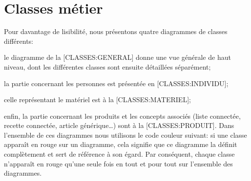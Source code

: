 \chapter[CH:CM]{Classes métier}

Pour davantage de lisibilité, nous présentons quatre diagrammes de classes différents:
\startitemize
\item le diagramme de la [CLASSES:GENERAL] donne une vue générale de haut niveau, dont les différentes classes sont ensuite détaillées séparément;
\item la partie concernant les personnes est présentée en [CLASSES:INDIVIDU];
\item celle représentant le matériel est à la [CLASSES:MATERIEL];
\item enfin, la partie concernant les produits et les concepts associés (liste connectée, recette connectée, article générique\dots) sont à la [CLASSES:PRODUIT].
\stopitemize
Dans l'ensemble de ces diagrammes nous utilisons le code couleur suivant: si une classe apparaît en rouge sur un diagramme, cela signifie que ce diagramme la définit complètement et sert de référence à son égard.
Par conséquent, chaque classe n'apparaît en rouge qu'une seule fois en tout et pour tout sur l'ensemble des diagrammes.

{}

{}

{}

{}

